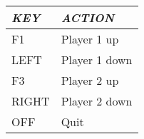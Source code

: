 \begin{center}\begin{tabular}{|p{2.269cm}|p{4.7710004cm}|}
\hline
{\centering\bfseries\itshape
KEY
\par}
&
{\centering\bfseries\itshape
ACTION
\par}
\\\hline
{\centering
F1
\par}
&
Player 1 up
\\\hline
{\centering
LEFT
\par}
&
Player 1 down
\\\hline
{\centering
F3
\par}
&
Player 2 up
\\\hline
{\centering
RIGHT
\par}
&
Player 2 down
\\\hline
{\centering
OFF
\par}
&
Quit
\\\hline
\end{tabular}\end{center}

